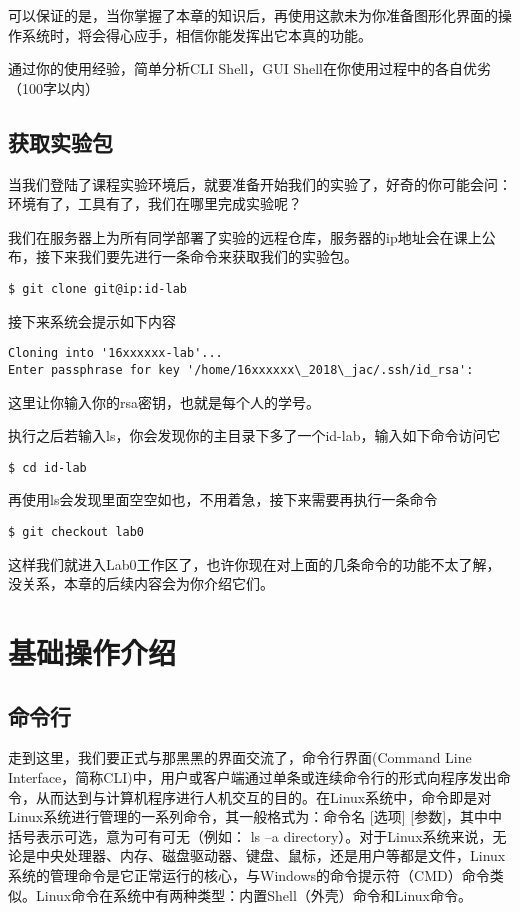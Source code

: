 可以保证的是，当你掌握了本章的知识后，再使用这款未为你准备图形化界面的操作系统时，将会得心应手，相信你能发挥出它本真的功能。

\begin{thinking}\label{think-Shell简析}
通过你的使用经验，简单分析CLI Shell，GUI Shell在你使用过程中的各自优劣（100字以内）
\end{thinking}

\subsection{获取实验包}

当我们登陆了课程实验环境后，就要准备开始我们的实验了，好奇的你可能会问：环境有了，工具有了，我们在哪里完成实验呢？

我们在服务器上为所有同学部署了实验的远程仓库，服务器的ip地址会在课上公布，接下来我们要先进行一条命令来获取我们的实验包。
\begin{verbatim}
$ git clone git@ip:id-lab
\end{verbatim}

接下来系统会提示如下内容
\begin{verbatim}
Cloning into '16xxxxxx-lab'...
Enter passphrase for key '/home/16xxxxxx\_2018\_jac/.ssh/id_rsa':
\end{verbatim}

这里让你输入你的rsa密钥，也就是每个人的学号。

执行之后若输入ls，你会发现你的主目录下多了一个id-lab，输入如下命令访问它
\begin{verbatim}
$ cd id-lab
\end{verbatim}

再使用ls会发现里面空空如也，不用着急，接下来需要再执行一条命令
\begin{verbatim}
$ git checkout lab0
\end{verbatim}

这样我们就进入Lab0工作区了，也许你现在对上面的几条命令的功能不太了解，没关系，本章的后续内容会为你介绍它们。

\section{基础操作介绍}
\subsection{命令行}
走到这里，我们要正式与那黑黑的界面交流了，命令行界面(Command Line Interface，简称CLI)中，用户或客户端通过单条或连续命令行的形式向程序发出命令，从而达到与计算机程序进行人机交互的目的。在Linux系统中，命令即是对Linux系统进行管理的一系列命令，其一般格式为：命令名 [选项] [参数]，其中中括号表示可选，意为可有可无（例如： ls –a directory）。对于Linux系统来说，无论是中央处理器、内存、磁盘驱动器、键盘、鼠标，还是用户等都是文件，Linux系统的管理命令是它正常运行的核心，与Windows的命令提示符（CMD）命令类似。Linux命令在系统中有两种类型：内置Shell（外壳）命令和Linux命令。


